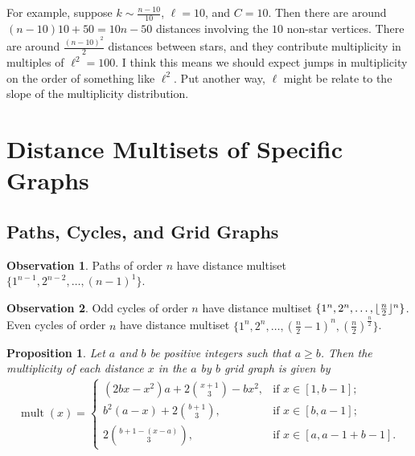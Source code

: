 \documentclass[12]{article}
\DeclarePairedDelimiter\floor{\lfloor}{\rfloor}
\DeclareMathOperator{\mult}{mult}
\newtheorem{prop}[thm]{Proposition}
\theoremstyle{definition}
\newtheorem{obs}{Observation}
\begin{document}
	For example, suppose $k \sim \tfrac{n-10}{10}$, $\ell = 10$, and $C = 10$.  Then there are around $(n-10)10 + 50 = 10n - 50$ distances involving the $10$ non-star vertices.  There are around $\tfrac{(n-10)^2}{2}$ distances between stars, and they contribute multiplicity in multiples of $\ell^2 = 100$.  I think this means we should expect jumps in multiplicity on the order of something like $\ell^2$.  Put another way, $\ell$ might be relate to the slope of the multiplicity distribution.
	\fi
	
	\newpage
	
	\section{Distance Multisets of Specific Graphs}
	
	\subsection{Paths, Cycles, and Grid Graphs}
	
	\begin{obs}
		Paths of order $n$ have distance multiset $\{1^{n-1},2^{n-2}, \ldots, (n-1)^1\}$.
	\end{obs}
	
	\begin{obs}
		Odd cycles of order $n$ have distance multiset $\{1^n, 2^n, \ldots, \floor{\tfrac{n}{2}}^n\}$.  Even cycles of order $n$ have distance multiset $\{1^n, 2^n, \ldots, (\tfrac{n}{2}-1)^n, (\tfrac{n}{2})^{\tfrac{n}{2}}\}$.
	\end{obs}
	
	\begin{prop}
		Let $a$ and $b$ be positive integers such that $a \geq b$.  Then the multiplicity of each distance $x$ in the $a$ by $b$ grid graph is given by
		\begin{align*}
			\mult(x) = 
			\begin{cases}
				(2bx-x^2)a + 2{x+1 \choose 3} - bx^2, &\text{if } x \in [1,b-1];	\\
				b^2(a-x) + 2{b+1 \choose 3}, &\text{if }x \in [b,a-1];	\\
				2{b+1 - (x-a) \choose 3}, &\text{if }x \in [a,a-1+b-1].
			\end{cases}
		\end{align*}
	\end{prop}
	
\end{document}
